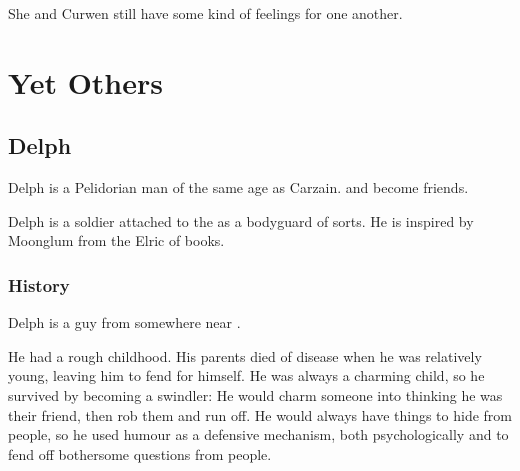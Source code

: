 She and Curwen still have some kind of feelings for one another. 












































\chapter{Yet Others}















\section{Delph}
Delph is a Pelidorian \human{} man of the same age as Carzain.  and become friends. 

Delph is a soldier attached to the \ishrah{} as a bodyguard of sorts. He is inspired by Moonglum from the Elric of \Melnibone{} books. 







\subsection{History}
Delph is a \Tepharin{} guy from somewhere near \Malcur. 

He had a rough childhood. His parents died of disease when he was relatively young, leaving him to fend for himself. He was always a charming child, so he survived by becoming a swindler: He would charm someone into thinking he was their friend, then rob them and run off. He would always have things to hide from people, so he used humour as a defensive mechanism, both psychologically and to fend off bothersome questions from people. 

